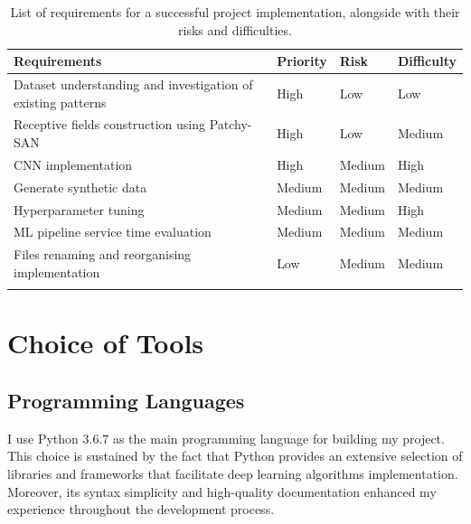 \begin{longtable}{|p{}|p{}|p{}|p{}|}
  \hline
  \textbf{Requirements}                                        & \textbf{Priority} & \textbf{Risk} & \textbf{Difficulty} \\
  \hline
  Dataset understanding and investigation of existing patterns & High              & Low           & Low                 \\

  Receptive fields construction using Patchy-SAN               & High              & Low           & Medium              \\

  CNN implementation                                           & High              & Medium        & High                \\

  Generate synthetic data                                      & Medium            & Medium        & Medium              \\

  Hyperparameter tuning                                        & Medium            & Medium        & High                \\

  ML pipeline service time evaluation                          & Medium            & Medium        & Medium              \\

  Files renaming and reorganising implementation               & Low               & Medium        & Medium              \\

  \hline
  \caption[Requirements overview]{List of requirements for a successful project implementation, alongside with their risks and difficulties.}
  \label{Requirements overview}
\end{longtable} \bigskip


\section{Choice of Tools}

\subsection{Programming Languages}

I use Python 3.6.7 as the main programming language for building my project. This choice is sustained by the fact that Python provides an extensive selection of libraries and frameworks that facilitate deep learning algorithms implementation. Moreover, its syntax simplicity and high-quality documentation enhanced my experience throughout the development process. \\\

